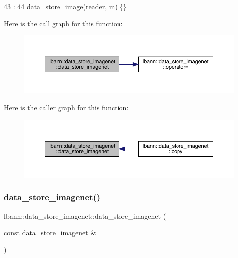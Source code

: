 \begin{DoxyCode}
43                                                              :
44     \hyperlink{classlbann_1_1data__store__image_a8fd8c5546f405a964511823aed8ac986}{data\_store\_image}(reader, m) \{\}
\end{DoxyCode}
Here is the call graph for this function\+:\nopagebreak
\begin{figure}[H]
\begin{center}
\leavevmode
\includegraphics[width=350pt]{classlbann_1_1data__store__imagenet_a3040285850664ccecb4795df3c85fb8d_cgraph}
\end{center}
\end{figure}
Here is the caller graph for this function\+:\nopagebreak
\begin{figure}[H]
\begin{center}
\leavevmode
\includegraphics[width=350pt]{classlbann_1_1data__store__imagenet_a3040285850664ccecb4795df3c85fb8d_icgraph}
\end{center}
\end{figure}
\mbox{\label{classlbann_1_1data__store__imagenet_abca3c81df8f4cd1c53f9b5b474da0481}} 
\subsubsection{\texorpdfstring{data\+\_\+store\+\_\+imagenet()}{data\_store\_imagenet()}\hspace{0.1cm}{\footnotesize\ttfamily [2/2]}}
{\footnotesize\ttfamily lbann\+::data\+\_\+store\+\_\+imagenet\+::data\+\_\+store\+\_\+imagenet (\begin{DoxyParamCaption}\item[{const \hyperlink{classlbann_1_1data__store__imagenet}{data\+\_\+store\+\_\+imagenet} \&}]{ }\end{DoxyParamCaption})\hspace{0.3cm}{\ttfamily [default]}}




